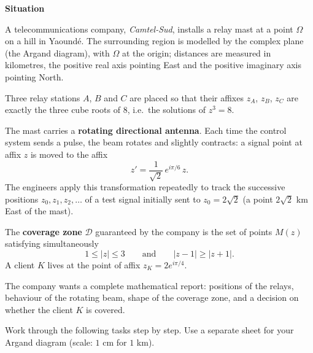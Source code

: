 \documentclass[11pt]{article}
\newcommand{\cle}[1]{{\popxbold\color{popdark}#1}}
\begin{document}
\textbf{Situation}\par
A telecommunications company, \emph{Camtel-Sud}, installs a relay mast at a point $\Omega$ on a hill in Yaoundé. The surrounding region is modelled by the complex plane (the \cle{Argand diagram}), with $\Omega$ at the origin; distances are measured in kilometres, the positive real axis pointing East and the positive imaginary axis pointing North.

Three relay stations $A$, $B$ and $C$ are placed so that their affixes $z_A$, $z_B$, $z_C$ are exactly the three \cle{cube roots of $8$}, i.e.\ the solutions of $z^3 = 8$.

The mast carries a \textbf{rotating directional antenna}. Each time the control system sends a pulse, the beam rotates and slightly contracts: a signal point at affix $z$ is moved to the affix
\[ z' = \frac{1}{\sqrt{2}}\,e^{i\pi/6}\, z. \]
The engineers apply this transformation repeatedly to track the successive positions $z_0, z_1, z_2, \dots$ of a test signal initially sent to $z_0 = 2\sqrt{2}$ (a point $2\sqrt{2}$ km East of the mast).

The \textbf{coverage zone} $\mathcal{D}$ guaranteed by the company is the set of points $M(z)$ satisfying simultaneously
\[ 1 \le |z| \le 3 \qquad \text{and} \qquad |z - 1| \ge |z + 1|. \]
A client $K$ lives at the point of affix $z_K = 2e^{i\pi/4}$.

The company wants a complete mathematical report: positions of the relays, behaviour of the rotating beam, shape of the coverage zone, and a decision on whether the client $K$ is covered.

\begin{experience}
Work through the following tasks step by step. Use a separate sheet for your Argand diagram (scale: $1$ cm for $1$ km).
\end{experience}
\end{document}
